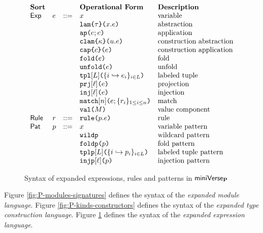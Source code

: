 \begin{figure}
\[\begin{array}{lllllll}
\textbf{Sort} & & & \textbf{Operational Form} 
& \textbf{Description}\\
\mathsf{Exp} & e & ::= & x 
& \text{variable}\\
&&& \aelam{\tau}{x}{e} 
& \text{abstraction}\\
&&& \aeap{e}{e} 
& \text{application}\\
&&& \aeclam{\kappa}{u}{e} %
& \text{construction abstraction}\\
&&& \aecap{e}{c} %
& \text{construction application}\\
&&& \aefold{e} %
& \text{fold}\\
&&& \aeunfold{e} %
& \text{unfold}\\
&&& \aetpl{\labelset}{\mapschema{e}{i}{\labelset}} 
& \text{labeled tuple}\\
&&& \aepr{\ell}{e} 
& \text{projection}\\
&&& \aein{\ell}{e} 
& \text{injection}\\
&&& \aematchwith{n}{e}{\seqschemaX{r}} 
& \text{match}\\
&&& \amval{M} 
& \text{value component}\\
\mathsf{Rule} & r & ::= & \aematchrule{p}{e} 
& \text{rule}\\
\mathsf{Pat} & p & ::= & x 
& \text{variable pattern}\\
&&& \aewildp 
& \text{wildcard pattern}\\
&&& \aefoldp{p} 
& \text{fold pattern}\\
&&& \aetplp{\labelset}{\mapschema{p}{i}{\labelset}} 
& \text{labeled tuple pattern}\\
&&& \aeinjp{\ell}{p} 
& \text{injection pattern}
\end{array}\]
\caption[Syntax of expanded expressions, rules and patterns in $\miniVerseParam$]{Syntax of expanded expressions, rules and patterns in $\miniVerseParam$}
\label{fig:P-expanded-terms}
\end{figure}


Figure \ref{fig:P-modules-signatures} defines the syntax of the \emph{expanded module language}. Figure \ref{fig:P-kinds-constructors} defines the syntax of the \emph{expanded type construction language}. Figure \ref{fig:P-expanded-terms} defines the syntax of the \emph{expanded expression language}.


